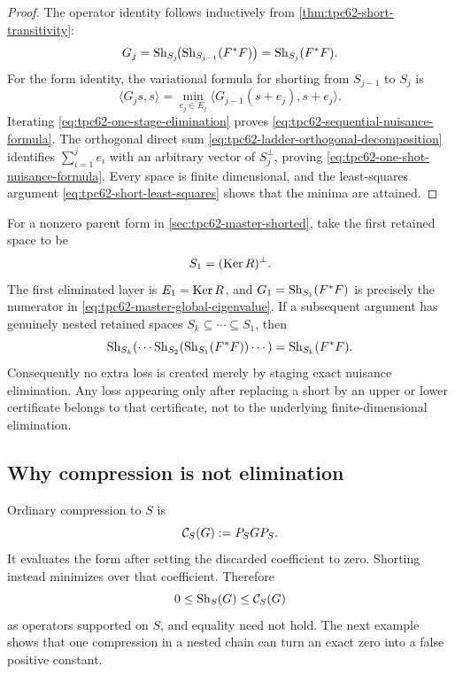 \begin{proof}
The operator identity follows inductively from
\cref{thm:tpc62-short-transitivity}:
\[
 G_j
 =\operatorname{Sh}_{S_j}\!\bigl(\operatorname{Sh}_{S_{j-1}}(F^*F)\bigr)
 =\operatorname{Sh}_{S_j}(F^*F).
\]
For the form identity, the variational formula for shorting from
\(S_{j-1}\) to \(S_j\) is
\begin{equation}
 \langle G_js,s\rangle
 =\min_{e_j\in E_j}
   \langle G_{j-1}(s+e_j),s+e_j\rangle.
 \label{eq:tpc62-one-stage-elimination}
\end{equation}
Iterating \eqref{eq:tpc62-one-stage-elimination} proves
\eqref{eq:tpc62-sequential-nuisance-formula}.  The orthogonal direct sum
\eqref{eq:tpc62-ladder-orthogonal-decomposition} identifies
\(\sum_{i=1}^j e_i\) with an arbitrary vector of \(S_j^\perp\), proving
\eqref{eq:tpc62-one-shot-nuisance-formula}.  Every space is finite
dimensional, and the least-squares argument
\eqref{eq:tpc62-short-least-squares} shows that the minima are attained.
\end{proof}

For a nonzero parent form in \cref{sec:tpc62-master-shorted}, take the
first retained space to be
\begin{equation}
 S_1=(\operatorname{Ker} R)^\perp.
 \label{eq:tpc62-parent-first-retained-space}
\end{equation}
The first eliminated layer is \(E_1=\operatorname{Ker} R\), and
\(G_1=\operatorname{Sh}_{S_1}(F^*F)\) is precisely the numerator in
\eqref{eq:tpc62-master-global-eigenvalue}.  If a subsequent argument has
genuinely nested retained spaces
\(S_k\subseteq\cdots\subseteq S_1\), then
\begin{equation}
 \operatorname{Sh}_{S_k}\!\left(\cdots
   \operatorname{Sh}_{S_2}\!\left(\operatorname{Sh}_{S_1}(F^*F)\right)\cdots\right)
 =\operatorname{Sh}_{S_k}(F^*F).
 \label{eq:tpc62-parent-all-at-once}
\end{equation}
Consequently no extra loss is created merely by staging exact nuisance
elimination.  Any loss appearing only after replacing a short by an upper
or lower certificate belongs to that certificate, not to the underlying
finite-dimensional elimination.

\subsection{Why compression is not elimination}

Ordinary compression to \(S\) is
\begin{equation}
 \mathcal C_S(G):=P_SGP_S.
 \label{eq:tpc62-compression-definition}
\end{equation}
It evaluates the form after setting the discarded coefficient to zero.
Shorting instead minimizes over that coefficient.  Therefore
\begin{equation}
 0\le\operatorname{Sh}_S(G)\le\mathcal C_S(G)
 \label{eq:tpc62-short-below-compression}
\end{equation}
as operators supported on \(S\), and equality need not hold.  The next
example shows that one compression in a nested chain can turn an exact
zero into a false positive constant.

